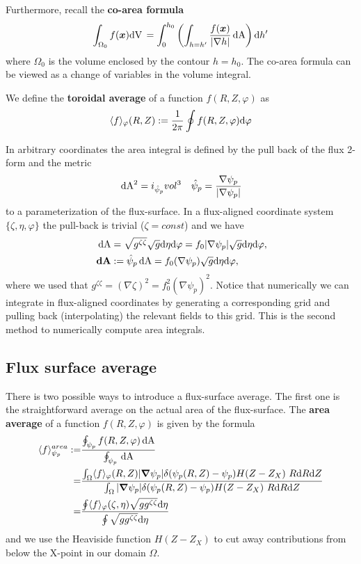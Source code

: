Furthermore, recall the {\bf co-area formula}
\begin{align} \label{eq:coarea}
\int_{\Omega_0} f({\boldsymbol{x}}) \mathrm{dV}\, =
\int_0^{h_0} \left( \int_{h=h'} \frac{f({\boldsymbol{x}})}{|\nabla h|}  \,\mathrm{dA}  \right) \mathrm{d} h'
\end{align}
where $\Omega_0$ is the volume enclosed by the contour $h=h_0$.
The co-area formula can be viewed as a change of variables in the
volume integral.

We define the {\bf toroidal average} of a function $f(R,Z,\varphi)$ as
\begin{align} \label{eq:phi_average}
\langle f\rangle_\varphi(R,Z) := \frac{1}{2\pi}\oint f(R,Z,\varphi)\mathrm{d} \varphi
\end{align}

In arbitrary coordinates the area integral is defined by the pull back
of the flux 2-form and the metric
\begin{align}
\label{}
\,\mathrm{dA}^2 = i_{\hat \psi_p} vol^3 \quad \hat \psi_p = \frac{\nabla \psi_p}{|\nabla \psi_p|}
\end{align}
to a parameterization of the flux-surface.
In a flux-aligned coordinate system $\{\zeta, \eta, \varphi\}$ the pull-back is trivial ($\zeta=const$) and we have
\begin{align}
\,\mathrm{dA} &= \sqrt{g^{\zeta\zeta}} \sqrt{g} \mathrm{d}\eta\mathrm{d}\varphi = f_0|\nabla\psi_p|\sqrt{g}\mathrm{d}\eta\mathrm{d}\varphi,
\\
{\boldsymbol{\,\mathrm{dA}}} &:= \hat\psi_p \,\mathrm{dA} = f_0 (\nabla\psi_p) \sqrt{g}\mathrm{d}\eta\mathrm{d}\varphi,\quad
\label{}
\end{align}
where we used that $g^{\zeta\zeta} = (\nabla\zeta)^2 = f_0^2(\nabla\psi_p)^2$.
Notice that numerically we can integrate in flux-aligned coordinates by generating a corresponding
grid and pulling back (interpolating) the relevant fields to this grid. This is the second method
to numerically compute area integrals.

\subsection{Flux surface average}

There is two possible ways to introduce a flux-surface average.
The first one is the straightforward average on the actual area of the
flux-surface.
The {\bf area average}
of a function $f(R,Z,\varphi)$ is given by the formula
\begin{align}\label{eq:fsa_area}
\langle f \rangle^{area}_{\psi_{p}} :=&
\frac{ \oint_{\psi_p  } f(R,Z,\varphi)\,\mathrm{dA}}{\oint_{\psi_p } \,\mathrm{dA}} \nonumber \\
=& \frac{\int_\Omega \langle f\rangle_\varphi(R,Z) |{\boldsymbol{\nabla}}\psi_p| \delta(\psi_p(R,Z)-\psi_{p})H(Z-Z_X)\ R \mathrm{d} R \mathrm{d} Z}
{\int_\Omega |{\boldsymbol{\nabla}}\psi_p|\delta(\psi_p(R,Z)-\psi_{p})H(Z-Z_X)\ R \mathrm{d} R \mathrm{d} Z} \nonumber\\
=& \frac{\oint \langle f\rangle_\varphi(\zeta,\eta) \sqrt{g g^{\zeta\zeta}}\mathrm{d}\eta}
         { \oint \sqrt{g g^{\zeta\zeta}}\mathrm{d}\eta}
\end{align}
and we use the Heaviside function $H(Z-Z_X)$ to cut away contributions from below the X-point
in our domain $\Omega$.

